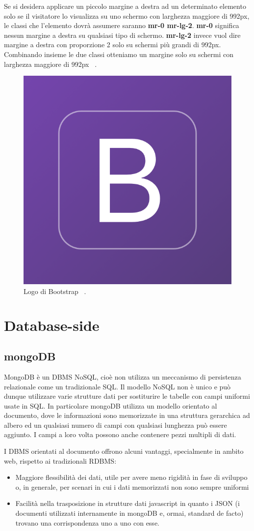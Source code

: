 \noindent Se si desidera applicare un piccolo margine a destra ad un determinato elemento solo se il visitatore lo visualizza su uno schermo con larghezza maggiore di 992px, le classi che l'elemento dovrà assumere saranno \textbf{mr-0 mr-lg-2}.\newline
\textbf{mr-0} significa nessun margine a destra su qualsiasi tipo di schermo. \textbf{mr-lg-2} invece vuol dire margine a destra con proporzione 2 solo su schermi più grandi di 992px. Combinando insieme le due classi otteniamo un margine solo su schermi con larghezza maggiore di 992px ~\cite{bootstrapDoc}.
\begin{figure}[H]
    \centering
    \includegraphics[width=0.2\linewidth]{img/logos/bootstrap_logo.png}
    \caption{Logo di Bootstrap ~\cite{Bootstra56:online}.}
    \label{bootstrapLogo}
\end{figure}

\section{Database-side}
\subsection{mongoDB}

MongoDB è un DBMS NoSQL, cioè non utilizza un meccanismo di persistenza relazionale come un tradizionale SQL.\newline
Il modello NoSQL non è unico e può dunque utilizzare varie strutture dati per sostiturire le tabelle con campi uniformi usate in SQL.\newline
In particolare mongoDB utilizza un modello orientato al documento, dove le informazioni sono memorizzate in una struttura gerarchica ad albero ed un qualsiasi numero di campi con qualsiasi lunghezza può essere aggiunto. I campi a loro volta possono anche contenere pezzi multipli di dati.\newline

\noindent I DBMS orientati al documento offrono alcuni vantaggi, specialmente in ambito web, rispetto ai tradizionali RDBMS:
\begin{itemize}
    \item Maggiore flessibilità dei dati, utile per avere meno rigidità in fase di sviluppo o, in generale, per scenari in cui i dati memorizzati non sono sempre uniformi
    \item Facilità nella trasposizione in strutture dati javascript in quanto i JSON (i documenti utilizzati internamente in mongoDB e, ormai, standard de facto) trovano una corrispondenza uno a uno con esse.
\end{itemize}

